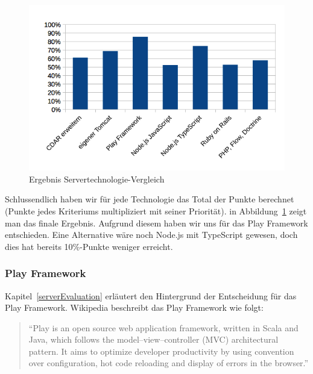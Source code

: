 			\begin{figure}[H]
				\begin{minipage}[b]{\linewidth}
					\includegraphics[width=\textwidth]{media/spreadsheets/ServertechnologieVergleichVergleichDerTechnologienDiagramm.png}
					\centering
					\caption{Ergebnis Servertechnologie-Vergleich}
					\label{fig:ErgebnisServertechnologieVergleich}
				\end{minipage}
			\end{figure}
			
			Schlussendlich haben wir für jede Technologie das Total der Punkte berechnet (Punkte jedes Kriteriums multipliziert mit seiner Priorität). in Abbildung~\ref{fig:ErgebnisServertechnologieVergleich} zeigt man das finale Ergebnis. Aufgrund diesem haben wir uns für das Play Framework entschieden. Eine Alternative wäre noch Node.js mit TypeScript gewesen, doch dies hat bereits 10\%-Punkte weniger erreicht.

		\subsubsection{Play Framework}
			Kapitel~\ref{serverEvaluation} erläutert den Hintergrund der Entscheidung für das Play Framework. 
			Wikipedia beschreibt das Play Framework wie folgt:
			\begin{quote}
				"`Play is an open source web application framework, written in Scala and Java, which follows the model–view–controller (MVC) architectural pattern. It aims to optimize developer productivity by using convention over configuration, hot code reloading and display of errors in the browser."'\cite{playFrameworkWikipedia}
			\end{quote}
			
